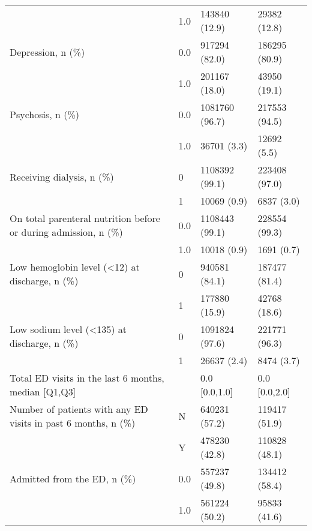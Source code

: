 \begin{tabular}{llll}
                                       & 1.0 &                         143840 (12.9) &      29382 (12.8) \\
Depression, n (\%) & 0.0 &                         917294 (82.0) &     186295 (80.9) \\
                                       & 1.0 &                         201167 (18.0) &      43950 (19.1) \\
Psychosis, n (\%) & 0.0 &                        1081760 (96.7) &     217553 (94.5) \\
                                       & 1.0 &                           36701 (3.3) &       12692 (5.5) \\
Receiving dialysis, n (\%) & 0 &                        1108392 (99.1) &     223408 (97.0) \\
                                       & 1 &                           10069 (0.9) &        6837 (3.0) \\
On total parenteral nutrition before or during admission, n (\%) & 0.0 &                        1108443 (99.1) &     228554 (99.3) \\
                                       & 1.0 &                           10018 (0.9) &        1691 (0.7) \\
Low hemoglobin level (<12) at discharge, n (\%) & 0 &                         940581 (84.1) &     187477 (81.4) \\
                                       & 1 &                         177880 (15.9) &      42768 (18.6) \\
Low sodium level (<135) at discharge, n (\%) & 0 &                        1091824 (97.6) &     221771 (96.3) \\
                                       & 1 &                           26637 (2.4) &        8474 (3.7) \\
Total ED visits in the last 6 months, median [Q1,Q3] &   &                         0.0 [0.0,1.0] &     0.0 [0.0,2.0] \\
Number of patients with any ED visits in past 6 months, n (\%) & N &                         640231 (57.2) &     119417 (51.9) \\
                                       & Y &                         478230 (42.8) &     110828 (48.1) \\
Admitted from the ED, n (\%) & 0.0 &                         557237 (49.8) &     134412 (58.4) \\
                                       & 1.0 &                         561224 (50.2) &      95833 (41.6) \\

\end{tabular}
